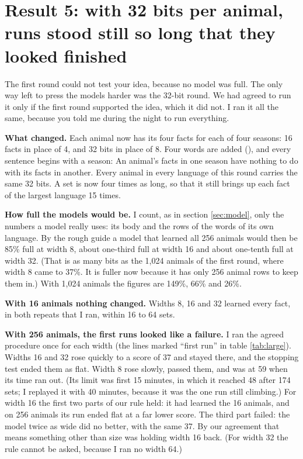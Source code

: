 \section{Result 5: with 32 bits per animal, runs stood still so long that they looked finished}
\label{sec:round32}

The first round could not test your idea, because no model was full. The only way left to press
the models harder was the 32-bit round. We had agreed to run it only if the first round
supported the idea, which it did not. I ran it all the same, because you told me during the
night to run everything.

\textbf{What changed.} Each animal now has its four facts for each of four seasons: 16 facts
in place of 4, and 32 bits in place of 8. Four words are added (),
and every sentence begins with a season:  An animal's facts in one
season have nothing to do with its facts in another. Every animal in every language of this
round carries the same 32 bits. A set is now four times as long, so that it still brings up
each fact of the largest language 15 times.

\textbf{How full the models would be.} I count, as in section \ref{sec:model}, only the numbers
a model really uses: its body and the rows of the words of its own language. By the rough guide
a model that learned all 256 animals would then be 85\% full at width 8, about one-third full
at width 16 and about one-tenth full at width 32. (That is as many bits as the 1,024 animals
of the first round, where width 8 came to 37\%. It is fuller now because it has only 256 animal
rows to keep them in.) With 1,024 animals the figures are 149\%, 66\% and 26\%.

\textbf{With 16 animals nothing changed.} Widths 8, 16 and 32 learned every fact, in both
repeats that I ran, within 16 to 64 sets.

\textbf{With 256 animals, the first runs looked like a failure.} I ran the agreed procedure
once for each width (the lines marked ``first run'' in table \ref{tab:large}). Widths 16 and 32
rose quickly to a score of 37 and stayed there, and the stopping test ended them as flat. Width
8 rose slowly, passed them, and was at 59 when its time ran out. (Its limit was first 15
minutes, in which it reached 48 after 174 sets; I replayed it with 40 minutes, because it was
the one run still climbing.) For width 16 the first two parts of our rule held: it had learned the 16
animals, and on 256 animals its run ended flat at a far lower score. The third part failed:
the model twice as wide did no better, with the same 37. By our agreement that means something
other than size was holding width 16 back. (For width 32 the rule cannot be asked, because I
ran no width 64.)

